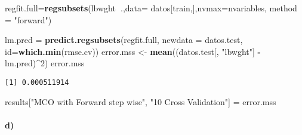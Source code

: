 \documentclass[]{article}
\newenvironment{Shaded}{\begin{snugshade}}{\end{snugshade}}
\newcommand{\KeywordTok}[1]{\textcolor[rgb]{0.13,0.29,0.53}{\textbf{#1}}}
\newcommand{\DataTypeTok}[1]{\textcolor[rgb]{0.13,0.29,0.53}{#1}}
\newcommand{\DecValTok}[1]{\textcolor[rgb]{0.00,0.00,0.81}{#1}}
\newcommand{\StringTok}[1]{\textcolor[rgb]{0.31,0.60,0.02}{#1}}
\newcommand{\OperatorTok}[1]{\textcolor[rgb]{0.81,0.36,0.00}{\textbf{#1}}}
\newcommand{\NormalTok}[1]{#1}
\let\oldparagraph\paragraph
\renewcommand{\paragraph}[1]{\oldparagraph{#1}\mbox{}}
\begin{document}
\begin{Shaded}
\begin{Highlighting}[]
\NormalTok{regfit.full=}\KeywordTok{regsubsets}\NormalTok{(lbwght}\OperatorTok{~}\NormalTok{.,}\DataTypeTok{data=}\NormalTok{ datos[train,],}\DataTypeTok{nvmax=}\NormalTok{nvariables, }\DataTypeTok{method =} \StringTok{"forward"}\NormalTok{)}

\NormalTok{lm.pred =}\StringTok{ }\KeywordTok{predict.regsubsets}\NormalTok{(regfit.full, }\DataTypeTok{newdata =}\NormalTok{ datos.test, }\DataTypeTok{id=}\KeywordTok{which.min}\NormalTok{(rmse.cv))}
\NormalTok{error.mss <-}\StringTok{ }\KeywordTok{mean}\NormalTok{((datos.test[, }\StringTok{"lbwght"}\NormalTok{] }\OperatorTok{-}\StringTok{ }\NormalTok{lm.pred)}\OperatorTok{^}\DecValTok{2}\NormalTok{)}
\NormalTok{error.mss }
\end{Highlighting}
\end{Shaded}

\begin{verbatim}
[1] 0.000511914
\end{verbatim}

\begin{Shaded}
\begin{Highlighting}[]
\NormalTok{results[}\StringTok{"MCO with Forward step wise"}\NormalTok{, }\StringTok{"10 Cross Validation"}\NormalTok{] =}\StringTok{ }\NormalTok{error.mss}
\end{Highlighting}
\end{Shaded}

\paragraph{d)}\label{d}
\end{document}
